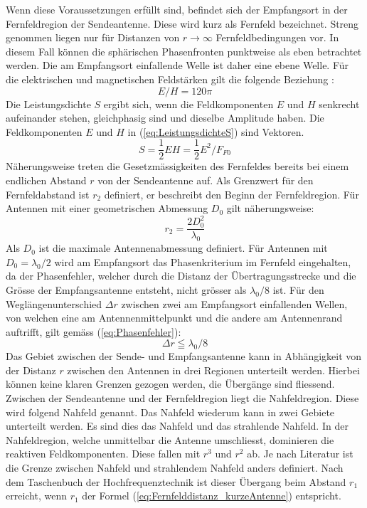  Wenn diese Voraussetzungen erfüllt sind, befindet sich der Empfangsort in der Fernfeldregion der Sendeantenne. Diese wird kurz als Fernfeld bezeichnet. Streng genommen liegen nur für Distanzen von $r\rightarrow\infty$ Fernfeldbedingungen vor. In diesem Fall können die sphärischen Phasenfronten punktweise als eben betrachtet werden. Die am Empfangsort einfallende Welle ist daher eine ebene Welle. Für die elektrischen und magnetischen Feldstärken gilt die folgende Beziehung \cite{meinke1992taschenbuch}:
\begin{equation}
E/H=120\pi\label{eq:WellenimpedanuE/H}
\end{equation}
Die Leistungsdichte $S$ ergibt sich, wenn die Feldkomponenten $E$ und $H$ senkrecht aufeinander stehen, gleichphasig sind und dieselbe Amplitude haben. Die Feldkomponenten $E$ und $H$ in (\ref{eq:LeistungsdichteS}) sind Vektoren. 
\begin{equation}
S=\dfrac{1}{2}EH=\dfrac{1}{2} E^{2}/F_{F0}\label{eq:LeistungsdichteS}
\end{equation}
Näherungsweise treten die Gesetzmässigkeiten des Fernfeldes bereits bei einem endlichen Abstand $r$ von der Sendeantenne auf. Als Grenzwert für den Fernfeldabstand ist $r_{2}$ definiert, er beschreibt den Beginn der Fernfeldregion. Für Antennen mit einer geometrischen Abmessung $D_{0}$ gilt näherungsweise\cite{meinke1992taschenbuch}:
\begin{equation}
r_{2}=\dfrac{2D_{0}^{2}}{\lambda_{0}} \label{eq:Fernfelddistanz_r2}
\end{equation}
Als $D_{0}$ ist die maximale Antennenabmessung definiert. Für Antennen mit $D_{0}=\lambda_{0}/2$ wird am Empfangsort das Phasenkriterium im Fernfeld eingehalten, da der Phasenfehler, welcher durch die Distanz der Übertragungsstrecke und die Grösse der Empfangsantenne entsteht, nicht grösser als $\lambda_{0}/8$ ist. Für den Weglängenunterschied $\Delta r$ zwischen zwei am Empfangsort einfallenden Wellen, von welchen eine am Antennenmittelpunkt und die andere am Antennenrand auftrifft, gilt gemäss (\ref{eq:Phasenfehler})\cite{meinke1992taschenbuch}:
\begin{equation}
\Delta r\leqq\lambda_{0}/8 \label{eq:Phasenfehler}
\end{equation}
Das Gebiet zwischen der Sende- und Empfangsantenne kann in Abhängigkeit von der Distanz $r$ zwischen den Antennen in drei Regionen unterteilt werden. Hierbei können keine klaren Grenzen gezogen werden, die Übergänge sind fliessend. Zwischen der Sendeantenne und der Fernfeldregion liegt die Nahfeldregion. Diese wird folgend Nahfeld genannt. Das Nahfeld wiederum kann in zwei Gebiete unterteilt werden. Es sind dies das Nahfeld und das strahlende Nahfeld. In der Nahfeldregion, welche unmittelbar die Antenne umschliesst, dominieren die reaktiven Feldkomponenten. Diese fallen mit $r^{3}$ und $r^{2}$ ab. Je nach Literatur ist die Grenze zwischen Nahfeld und strahlendem Nahfeld anders definiert. Nach dem Taschenbuch der Hochfrequenztechnik ist dieser Übergang beim Abstand $r_{1}$ erreicht, wenn $r_{1}$ der Formel (\ref{eq:Fernfelddistanz_kurzeAntenne}) entspricht\cite{meinke1992taschenbuch}.

